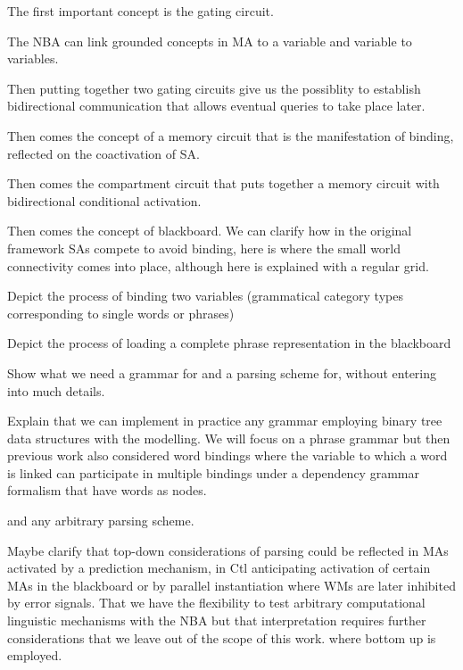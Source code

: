 \documentclass[10pt]{article}
\begin{document}
The first important concept is the gating circuit.

The NBA can link grounded concepts in MA to a variable and variable to variables.

Then putting together two gating circuits give us the possiblity to establish bidirectional communication that allows eventual queries to take place later.

Then comes the concept of a memory circuit that is the manifestation of binding, reflected on the coactivation of SA.

Then comes the compartment circuit that puts together a memory circuit with bidirectional conditional activation.

Then comes the concept of blackboard. We can clarify how in the original framework SAs compete to avoid binding, here is where the small world connectivity comes into place, although here is explained with a regular grid.

Depict the process of binding two variables (grammatical category types corresponding to single words or phrases)

Depict the process of loading a complete phrase representation in the blackboard

Show what we need a grammar for and a parsing scheme for, without entering into much details. 

Explain that we can implement in practice any grammar employing binary tree data structures with the modelling. We will focus on a phrase grammar but then previous work also considered word bindings where the variable to which a word is linked can participate in multiple bindings under a dependency grammar formalism that have words as nodes.

and any arbitrary parsing scheme.

Maybe clarify that top-down considerations of parsing could be reflected in MAs activated by a prediction mechanism, in Ctl anticipating activation of certain MAs in the blackboard or by parallel instantiation where WMs are later inhibited by error signals. That we have the flexibility to test arbitrary computational linguistic mechanisms with the NBA but that interpretation requires further considerations that we leave out of the scope of this work. where bottom up is employed.
\end{document}
